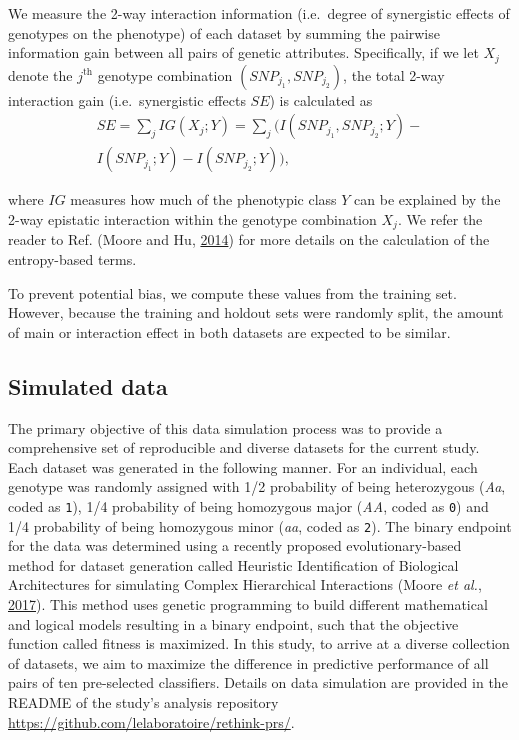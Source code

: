 \documentclass[a4paper,twoside, 9pt]{article}
\begin{document}
We measure the 2-way interaction information (i.e.~degree of synergistic
effects of genotypes on the phenotype) of each dataset by summing the
pairwise information gain between all pairs of genetic attributes.
Specifically, if we let \(X_j\) denote the \(j^\textrm{th}\) genotype
combination \((SNP_{j_1}, SNP_{j_2})\), the total 2-way interaction gain
(i.e.~synergistic effects \(SE\)) is calculated as
\begin{multline}
SE = \sum_{j}IG(X_j; Y)= \sum_{j} (I(SNP_{j_1}, SNP_{j_2}; Y) -\\ I(SNP_{j_1}; Y) - I(SNP_{j_2}; Y)),
\end{multline}

where \(IG\) measures how much of the phenotypic class \(Y\) can be
explained by the 2-way epistatic interaction within the genotype
combination \(X_j\). We refer the reader to Ref. (Moore and Hu,
\protect\hyperlink{ref-1FFMLUZxb}{2014}) for more details on the
calculation of the entropy-based terms.

To prevent potential bias, we compute these values from the training set.
However, because the training and holdout sets were randomly split, the amount of main or interaction effect in both datasets are expected to be similar.

\subsection{Simulated data}\label{simulated-data}

\noindent The primary objective of this data simulation process was to provide a
comprehensive set of reproducible and diverse datasets for the current
study. Each dataset was generated in the following manner. For an
individual, each genotype was randomly assigned with 1/2 probability of
being heterozygous (\emph{Aa}, coded as \texttt{1}), 1/4 probability of
being homozygous major (\emph{AA}, coded as \texttt{0}) and 1/4
probability of being homozygous minor (\emph{aa}, coded as \texttt{2}).
The binary endpoint for the data was determined using a recently
proposed evolutionary-based method for dataset generation called
Heuristic Identification of Biological Architectures for simulating
Complex Hierarchical Interactions (Moore \emph{et al.},
\protect\hyperlink{ref-pDXdtMFa}{2017}). 
This method uses genetic programming to build different mathematical and logical models resulting in a binary endpoint, such that the objective function called fitness is maximized.
In this study, to arrive at a diverse collection of datasets, we aim to maximize the difference in predictive performance of all pairs of ten pre-selected classifiers.
Details on data simulation are
provided in the README of the study's analysis repository
\url{https://github.com/lelaboratoire/rethink-prs/}.
\end{document}
